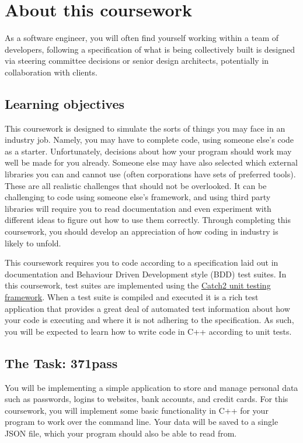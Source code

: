\documentclass[a4paper]{article}
\begin{document}
\newpage\section*{About this coursework}\label{sec:about}
As a software engineer, you will often find yourself working within a team of developers, following a specification of what is being collectively built is designed via steering committee decisions or senior design architects, potentially in collaboration with clients. 

\subsection*{Learning objectives}
This coursework is designed to simulate the sorts of things you may face in an industry job. Namely, you may have to complete code, using someone else’s code as a starter. Unfortunately, decisions about how your program should work may well be made for you already. Someone else may have also selected which external libraries you can and cannot use (often corporations have sets of preferred tools). These are all realistic challenges that should not be overlooked. It can be challenging to code using someone else’s framework, and using third party libraries will require you to read documentation and even experiment with different ideas to figure out how to use them correctly. Through completing this coursework, you should develop an appreciation of how coding in industry is likely to unfold.

This coursework requires you to code according to a specification laid out in documentation and Behaviour Driven Development style (BDD) test suites. In this coursework, test suites are implemented using the \href{https://github.com/catchorg/Catch2}{Catch2 unit testing framework}. When a test suite is compiled and executed it is a rich test application that provides a great deal of automated test information about how your code is executing and where it is not adhering to the specification. As such, you will be expected to learn how to write code in C++ according to unit tests.



\subsection*{The Task: 371pass}
You will be implementing a simple application to store and manage personal data such as passwords, logins to websites, bank accounts, and credit cards. For this coursework, you will implement some basic functionality in C++ for your program to work over the command line. Your data will be saved to a single JSON file, which your program should also be able to read from.
\end{document}
